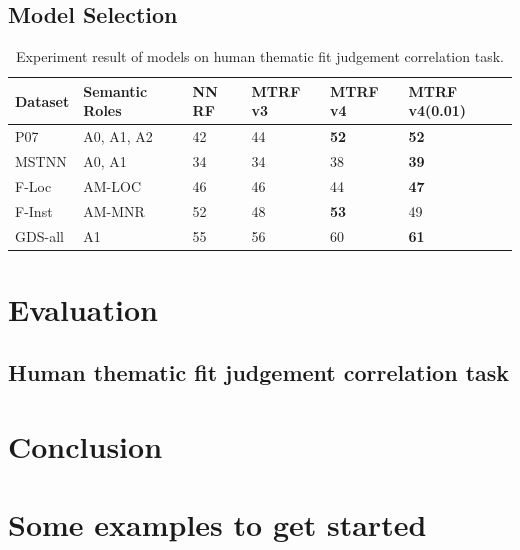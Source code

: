 \documentclass[a4paper]{article}
\begin{document}
\subsection{Model Selection}





\begin{table}[t]
\centering
\begin{tabular}{l|l|l|l|l|l}
Dataset &   Semantic Roles  &   NN RF   &   MTRF v3 &   MTRF v4     &   MTRF v4(0.01)    \\ \hline
P07     &   A0, A1, A2      &   42      &   44      &   \textbf{52} &   \textbf{52}     \\
MSTNN   &   A0, A1          &   34      &   34      &   38          &   \textbf{39}     \\
F-Loc   &   AM-LOC          &   46      &   46      &   44          &   \textbf{47}     \\
F-Inst  &   AM-MNR          &   52      &   48      &   \textbf{53} &   49              \\
GDS-all &   A1              &   55      &   56      &   60          &   \textbf{61}     \\
\end{tabular}
\caption{\label{tab:widgets} Experiment result of models on human thematic fit judgement correlation task.}
\end{table}



\section{Evaluation}

\subsection{Human thematic fit judgement correlation task}







\section{Conclusion}





\newpage



\section{Some examples to get started}
\end{document}
